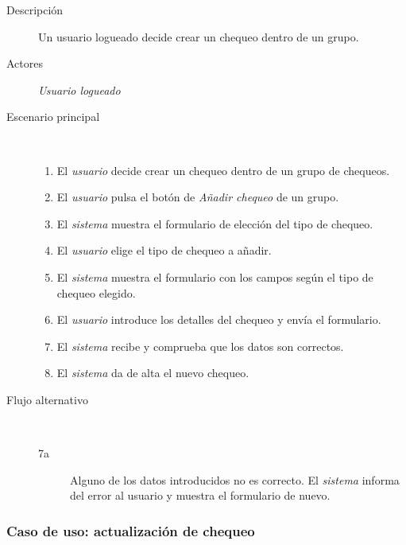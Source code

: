 \begin{description}
\item[Descripción] Un usuario logueado decide crear un chequeo dentro de un grupo.
\item[Actores] \textit{Usuario logueado}
\item[Escenario principal] $\quad$
  \begin{enumerate}
  \item El \textit{usuario} decide crear un chequeo dentro de un grupo de chequeos.
  \item El \textit{usuario} pulsa el botón de \textit{Añadir chequeo} de un grupo.
  \item El \textit{sistema} muestra el formulario de elección del tipo de chequeo.
  \item El \textit{usuario} elige el tipo de chequeo a añadir.
  \item El \textit{sistema} muestra el formulario con los campos según el tipo de chequeo elegido.
  \item El \textit{usuario} introduce los detalles del chequeo y envía el formulario.
  \item El \textit{sistema} recibe y comprueba que los datos son correctos.
  \item El \textit{sistema} da de alta el nuevo chequeo.
  \end{enumerate}
\item[Flujo alternativo] $\quad$
  \begin{description}
  \item[7a] Alguno de los datos introducidos no es correcto. El \textit{sistema}
    informa del error al usuario y muestra el formulario de nuevo.
  \end{description}
\end{description}


\subsubsection{Caso de uso: actualización de chequeo}

